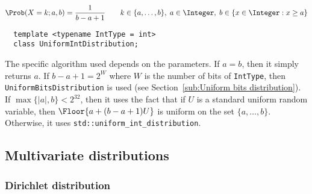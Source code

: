 \begin{equation*}
  \Prob(X = k;a,b) = \frac{1}{b - a + 1} \qquad
  k \in \{a,\dots,b\},\; a \in \Integer,\; b \in \{x \in \Integer: x \ge a\}
\end{equation*}
\begin{Verbatim}
  template <typename IntType = int>
  class UniformIntDistribution;
\end{Verbatim}
The specific algorithm used depends on the parameters. If $a = b$, then it
simply returns $a$. If $b - a + 1 = 2^W$ where $W$ is the number of bits of
\verb|IntType|, then \verb|UniformBitsDistribution| is used (see
Section~\ref{sub:Uniform bits distribution}). If $\max\{|a|, b\} < 2^{32}$,
then it uses the fact that if $U$ is a standard uniform random variable, then
$\Floor{a + (b - a + 1) U}$ is uniform on the set $\{a,\dots,b\}$. Otherwise,
it uses \verb|std::uniform_int_distribution|.

\subsection{Multivariate distributions}
\label{sub:Multivariate distributions}

\subsubsection{Dirichlet distribution}

